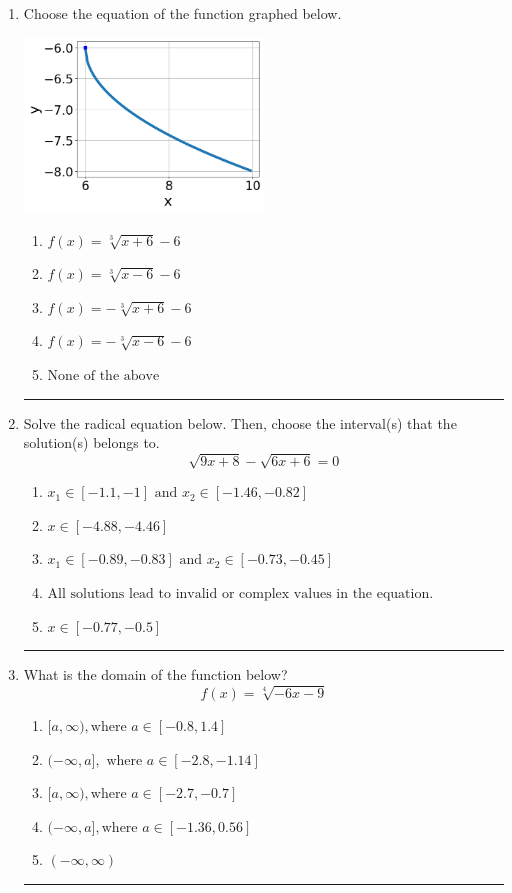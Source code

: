 \documentclass[14pt]{extbook}
\newcommand{\litem}[1]{\item#1\hspace*{-1cm}\rule{\textwidth}{0.4pt}}
\begin{document}
\begin{enumerate}
{\begin{enumerate}[label=\Alph*.]
\end{enumerate} }
\litem{
Choose the equation of the function graphed below.
\begin{center}
    \includegraphics[width=0.5\textwidth]{../Figures/radicalGraphToEquationCopyC.png}
\end{center}
\begin{enumerate}[label=\Alph*.]
\item \( f(x) = \sqrt[3]{x + 6} - 6 \)
\item \( f(x) = \sqrt[3]{x - 6} - 6 \)
\item \( f(x) = - \sqrt[3]{x + 6} - 6 \)
\item \( f(x) = - \sqrt[3]{x - 6} - 6 \)
\item \( \text{None of the above} \)

\end{enumerate} }
\litem{
Solve the radical equation below. Then, choose the interval(s) that the solution(s) belongs to.\[ \sqrt{9 x + 8} - \sqrt{6 x + 6} = 0 \]\begin{enumerate}[label=\Alph*.]
\item \( x_1 \in [-1.1, -1] \text{ and } x_2 \in [-1.46,-0.82] \)
\item \( x \in [-4.88,-4.46] \)
\item \( x_1 \in [-0.89, -0.83] \text{ and } x_2 \in [-0.73,-0.45] \)
\item \( \text{All solutions lead to invalid or complex values in the equation.} \)
\item \( x \in [-0.77,-0.5] \)

\end{enumerate} }
\litem{
What is the domain of the function below?\[ f(x) = \sqrt[4]{-6 x - 9} \]\begin{enumerate}[label=\Alph*.]
\item \( [a, \infty), \text{where } a \in [-0.8, 1.4] \)
\item \( (-\infty, a], \text{ where } a \in [-2.8, -1.14] \)
\item \( [a, \infty), \text{where } a \in [-2.7, -0.7] \)
\item \( (-\infty, a], \text{where } a \in [-1.36, 0.56] \)
\item \( (-\infty, \infty) \)


\end{enumerate}}
\end{enumerate}
\end{document}
